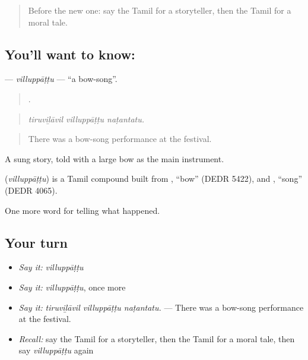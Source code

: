 \label{lesson:TA-C345-villuppattu}



\begin{quote}
Before the new one: say the Tamil for a storyteller, then the Tamil for a moral tale.
\end{quote}

\subsection*{You'll want to know: }
\textbf{} — \emph{villuppāṭṭu} — \textquotedblleft{}a bow-song\textquotedblright{}.

\begin{quote}
  .
\end{quote}

\begin{quote}
\emph{tiruviḻāvil villuppāṭṭu naṭantatu.}
\end{quote}

\begin{quote}
There was a bow-song performance at the festival.
\end{quote}

A sung story, told with a large bow as the main instrument.

\begin{cousinweb}
\textbf{} (\emph{villuppāṭṭu}) is a Tamil compound built from , \textquotedblleft{}bow\textquotedblright{} (DEDR 5422), and , \textquotedblleft{}song\textquotedblright{} (DEDR 4065).
\end{cousinweb}

\begin{grammarlens}[title={What you've built}]
One more word for telling what happened.
\end{grammarlens}

\subsection*{Your turn}
\begin{itemize}
\raggedright
  \item \emph{Say it:} \emph{villuppāṭṭu}
  \item \emph{Say it:} \emph{villuppāṭṭu}, once more
  \item \emph{Say it:} \emph{tiruviḻāvil villuppāṭṭu naṭantatu.} — There was a bow-song performance at the festival.
  \item \emph{Recall:} say the Tamil for a storyteller, then the Tamil for a moral tale, then say \emph{villuppāṭṭu} again
\end{itemize}

